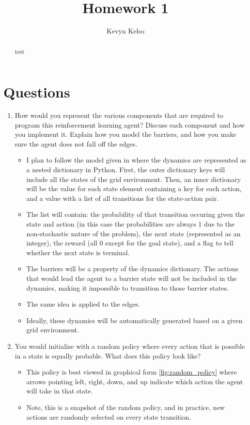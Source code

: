 \documentclass[letterpaper]{article} %
\title{Homework 1}
\author{
    Kevyn Kelso
}
\begin{document}
\maketitle

\begin{abstract}
test
\end{abstract}

\section{Questions}
\begin{enumerate}
    \item How would you represent the various components that are required to program this reinforcement learning agent? Discuss each component and how you implement it. Explain how you model the barriers, and how you make sure the agent does not fall off the edges.
	\begin{itemize}
	    \item I plan to follow the model given in \cite{Morales2020GrokkingDL} where the dynamics are represented as a nested dictionary in Python. First, the outer dictionary keys will include all the states of the grid environment. Then, an inner dictionary will be the value for each state element containing a key for each action, and a value with a list of all transitions for the state-action pair.
	    \item The list will contain: the probability of that transition occuring given the state and action (in this case the probabilities are always 1 due to the non-stochastic nature of the problem), the next state (represented as an integer), the reward (all 0 except for the goal state), and a flag to tell whether the next state is terminal.
	    \item The barriers will be a property of the dynamics dictionary. The actions that would lead the agent to a barrier state will not be included in the dynamics, making it impossible to transition to those barrier states.
	    \item The same idea is applied to the edges.
	    \item Ideally, these dynamics will be automatically generated based on a given grid environment.
	\end{itemize}
    \item You would initialize with a random policy where every action that is possible in a state is equally probable. What does this policy look like?
	\begin{itemize}
	    \item This policy is best viewed in graphical form \ref{fig:random_policy} where arrows pointing left, right, down, and up indicate which action the agent will take in that state.
	    \item Note, this is a snapshot of the random policy, and in practice, new actions are randomly selected on every state transition.
	\end{itemize}


\end{enumerate}
\end{document}
